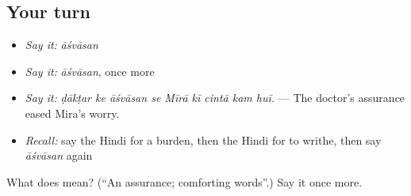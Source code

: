 \subsection*{Your turn}
\begin{itemize}
\raggedright
  \item \emph{Say it:} \emph{āśvāsan}
  \item \emph{Say it:} \emph{āśvāsan}, once more
  \item \emph{Say it:} \emph{ḍākṭar ke āśvāsan se Mīrā kī cintā kam huī.} — The doctor's assurance eased Mira's worry.
  \item \emph{Recall:} say the Hindi for a burden, then the Hindi for to writhe, then say \emph{āśvāsan} again
\end{itemize}

\begin{tcolorbox}[breakable,colback=teal!4,colframe=teal!35!black,title={Before you move on}]
What does  mean? (\textquotedblleft{}An assurance; comforting words\textquotedblright{}.) Say it once more.
\end{tcolorbox}
